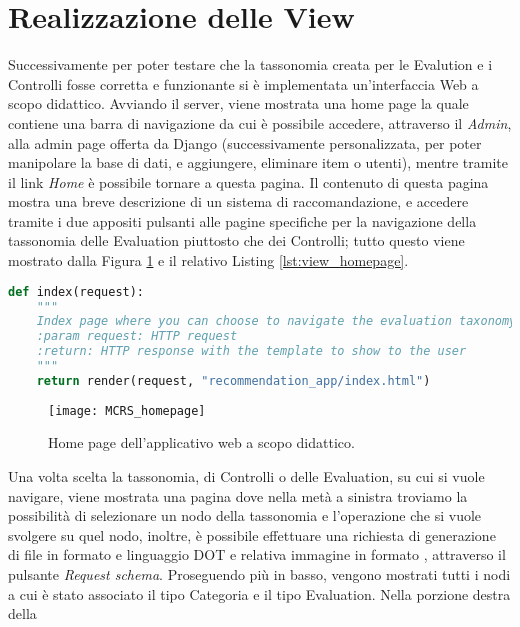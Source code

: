 \section*{Realizzazione delle View}
Successivamente per poter testare che la tassonomia creata per le Evalution e i Controlli fosse corretta e funzionante si è 
implementata un'interfaccia Web a scopo didattico.
Avviando il server, viene mostrata una home page la quale contiene una barra di navigazione da cui è possibile accedere,
attraverso il \textit{Admin}, alla admin page offerta da Django (successivamente personalizzata, per poter manipolare la base di dati, 
e aggiungere, eliminare item o utenti), mentre tramite il link \textit{Home} è possibile tornare a 
questa pagina. Il contenuto di questa pagina mostra una breve descrizione di un sistema di raccomandazione, e accedere tramite i due 
appositi pulsanti alle pagine specifiche per la navigazione della tassonomia delle Evaluation piuttosto che dei Controlli; tutto questo 
viene mostrato dalla Figura \ref{fig:MCRS_homepage} e il relativo Listing \ref{lst:view_homepage}.
%
\lstset{style=python_code_style}
\begin{lstlisting}[language=Python, label=lst:view_homepage, caption={Parte principale del codice delle View della soluzione per gestire l'accesso 
    alla home page.}]
def index(request):
    """
    Index page where you can choose to navigate the evaluation taxonomy or the control taxonomy.
    :param request: HTTP request
    :return: HTTP response with the template to show to the user
    """
    return render(request, "recommendation_app/index.html")
\end{lstlisting}
%
\begin{figure}[ht!]
    \texttt{[image: MCRS\_homepage]}
    \caption[Home page dell'applicativo web a scopo didattico]{Home page dell'applicativo web a scopo didattico.}
    \label{fig:MCRS_homepage}
\end{figure}
\hfill\break
Una volta scelta la tassonomia, di Controlli o delle Evaluation, su cui si vuole navigare, viene mostrata una pagina dove nella metà a sinistra 
troviamo la possibilità di selezionare un nodo della tassonomia e l'operazione che si vuole svolgere su quel nodo, inoltre, è possibile effettuare 
una richiesta di generazione di file in formato e linguaggio DOT e relativa immagine in formato , attraverso il pulsante \textit{Request schema}. 
Proseguendo più in basso, vengono mostrati tutti i nodi a cui è stato associato il tipo Categoria e il tipo Evaluation. Nella porzione destra della 
